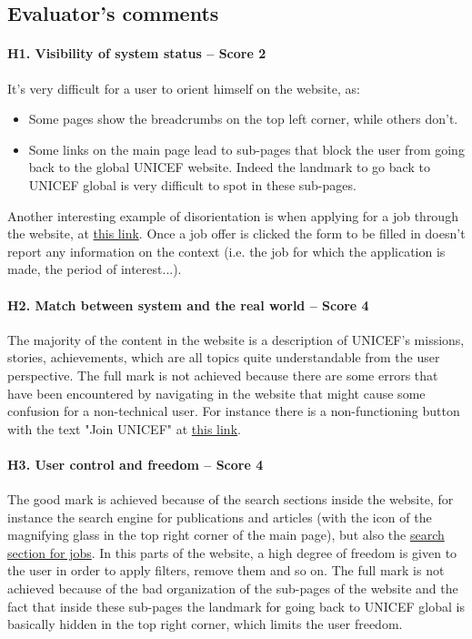 \clearpage

\subsection*{Evaluator's comments}
\paragraph*{H1. Visibility of system status – Score 2}
It's very difficult for a user to orient himself on the website, as:
\begin{itemize}
	\item Some pages show the breadcrumbs on the top left corner, while others don't.
	\item Some links on the main page lead to sub-pages that block the user from going back to the global UNICEF website. Indeed the landmark to go back to UNICEF global is very difficult to spot in these sub-pages.
\end{itemize}
Another interesting example of disorientation is when applying for a job through the website, at \href{https://jobs.unicef.org/en-us/listing/}{this link}. Once a job offer is clicked the form to be filled in doesn't report any information on the context (i.e. the job for which the application is made, the period of interest...).

\paragraph*{H2. Match between system and the real world – Score 4}
The majority of the content in the website is a description of UNICEF's missions, stories, achievements, which are all topics quite understandable from the user perspective. 
The full mark is not achieved because there are some errors that have been encountered by navigating in the website that might cause some confusion for a non-technical user. For instance there is a non-functioning button with the text "Join UNICEF" at \href{https://www.unicef.org/partnerships}{this link}.


\paragraph*{H3. User control and freedom – Score 4}
The good mark is achieved because of the search sections inside the website, for instance the search engine for publications and articles (with the icon of the magnifying glass in the top right corner of the main page), but also the \href{https://jobs.unicef.org/en-us/listing/}{search section for jobs}. In this parts of the website, a high degree of freedom is given to the user in order to apply filters, remove them and so on.
The full mark is not achieved because of the bad organization of the sub-pages of the website and the fact that inside these sub-pages the landmark for going back to UNICEF global is basically hidden in the top right corner, which limits the user freedom.



